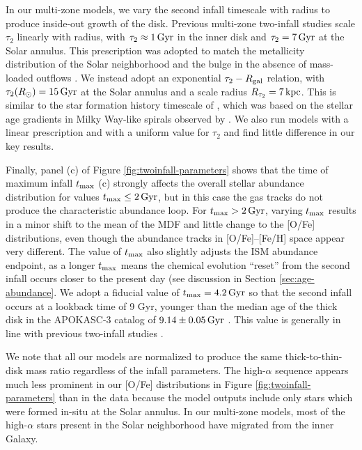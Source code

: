\documentclass[twocolumn,twocolappendix,linenumbers]{aastex631}
\begin{document}
In our multi-zone models, we vary the second infall timescale with radius to produce inside-out growth of the disk. Previous multi-zone two-infall studies \citep[e.g.,][]{chiappini_abundance_2001,palla_chemical_2020} scale $\tau_2$ linearly with radius, with $\tau_2\approx1\,{\rm Gyr}$ in the inner disk and $\tau_2=7\,{\rm Gyr}$ at the Solar annulus. This prescription was adopted to match the metallicity distribution of the Solar neighborhood and the bulge in the absence of mass-loaded outflows \citep{romano_mass_2000}. We instead adopt an exponential $\tau_2 - R_{\rm gal}$ relation, with $\tau_2(R_\odot)=15\,{\rm Gyr}$ at the Solar annulus and a scale radius $R_{\tau_2}=7\,{\rm kpc}$. This is similar to the star formation history timescale of \citet{johnson_stellar_2021}, which was based on the  stellar age gradients in Milky Way-like spirals observed by \citet{sanchez_spatially_2020}. We also run models with a linear prescription and with a uniform value for $\tau_2$ and find little difference in our key results.

Finally, panel (c) of Figure \ref{fig:twoinfall-parameters} shows that the time of maximum infall $t_{\rm max}$ (c) strongly affects the overall stellar abundance distribution for values $t_{\rm max}\leq2\,{\rm Gyr}$, but in this case the gas tracks do not produce the characteristic abundance loop. For $t_{\rm max}>2\,{\rm Gyr}$, varying $t_{\rm max}$ results in a minor shift to the mean of the MDF and little change to the [O/Fe] distributions, even though the abundance tracks in [O/Fe]--[Fe/H] space appear very different. The value of $t_{\rm max}$ also slightly adjusts the ISM abundance endpoint, as a longer $t_{\rm max}$ means the chemical evolution ``reset'' from the second infall occurs closer to the present day (see discussion in Section \ref{sec:age-abundance}. We adopt a fiducial value of $t_{\rm max}=4.2\,{\rm Gyr}$ so that the second infall occurs at a lookback time of 9 Gyr, younger than the median age of the thick disk in the APOKASC-3 catalog of $9.14\pm0.05\,{\rm Gyr}$ \citep{pinsonneault_apokasc-3_2024}. This value is generally in line with previous two-infall studies \citep[e.g.,][]{nissen_high-precision_2020,spitoni_galactic_2020,spitoni_apogee_2021}.

We note that all our models are normalized to produce the same thick-to-thin-disk mass ratio regardless of the infall parameters. The high-$\alpha$ sequence appears much less prominent in our [O/Fe] distributions in Figure \ref{fig:twoinfall-parameters} than in the data because the model outputs include only stars which were formed in-situ at the Solar annulus. In our multi-zone models, most of the high-$\alpha$ stars present in the Solar neighborhood have migrated from the inner Galaxy.
\end{document}
